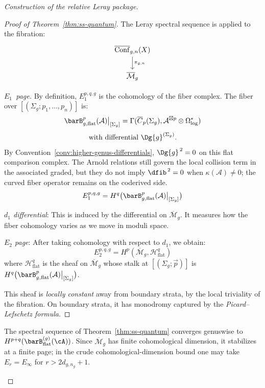 \begin{proof}[Construction of the relative Leray package]
\begin{proof}[Proof of Theorem~\ref{thm:ss-quantum}]
The Leray spectral sequence is applied to the fibration:
\begin{equation}
\begin{tikzcd}
\overline{\operatorname{Conf}}_{g,n}(X) \arrow[d, "\pi_{g,n}"] \\
\overline{\mathcal{M}}_g
\end{tikzcd}
\end{equation}

\emph{$E_1$~page.}
By definition, $E_1^{p,q,g}$ is the cohomology
of the fiber complex.
The fiber over
$[(\Sigma_g;\allowbreak p_1, \ldots, p_n)]$ is:
\begin{equation}
\barB^p_{g,\mathrm{flat}}(\mathcal{A})\big|_{[\Sigma_g]}
= \Gamma(\overline{C}_p(\Sigma_g), \mathcal{A}^{\boxtimes p}
\otimes \Omega^*_{\log})
\end{equation}
\[
\text{with differential } \Dg{g}^{(\Sigma_g)}.
\]
By Convention~\ref{conv:higher-genus-differentials},
$\Dg{g}^{\,2} = 0$ on this flat comparison complex. The Arnold
relations still govern the local collision term in the associated
graded, but they do not imply $\dfib^{\,2} = 0$ when
$\kappa(\mathcal{A}) \neq 0$; the curved fiber operator remains on the
coderived side.
\begin{equation}
E_1^{p,q,g}
= H^q\bigl(\barB^p_{g,\mathrm{flat}}(\mathcal{A})\big|_{[\Sigma_g]}\bigr)
\end{equation}

\emph{$d_1$ differential}: This is induced by the differential on $\overline{
\mathcal{M}}_g$. It measures how the fiber cohomology varies as we move in moduli space.

\emph{$E_2$ page}: After taking cohomology with respect to $d_1$, we obtain:
\begin{equation}
E_2^{p,q,g} = H^p(\overline{\mathcal{M}}_g, \mathcal{H}^q_{\mathrm{flat}})
\end{equation}
where $\mathcal{H}^q_{\mathrm{flat}}$ is the sheaf on
$\overline{\mathcal{M}}_g$ whose stalk at $[(\Sigma_g; \vec{p})]$ is
$H^q\bigl(\barB^p_{g,\mathrm{flat}}(\mathcal{A})\big|_{[\Sigma_g]}\bigr)$.

This sheaf is \emph{locally constant} away from boundary strata, by the local
triviality of the fibration. On boundary strata, it has monodromy captured by the
\emph{Picard--Lefschetz formula}.
\end{proof}

\begin{lemma}
\label{lem:quantum-ss-convergence}
The spectral sequence of
Theorem~\textup{\ref{thm:ss-quantum}} converges genuswise to
$H^{p+q}(\barB^{(g)}_{\mathrm{flat}}(\cA))$. Since
$\overline{\mathcal{M}}_g$ has finite cohomological dimension, it
stabilizes at a finite page; in the crude cohomological-dimension
bound one may take $E_r=E_\infty$ for $r>2d_{g,n_g}+1$.
\end{lemma}


\end{proof}
